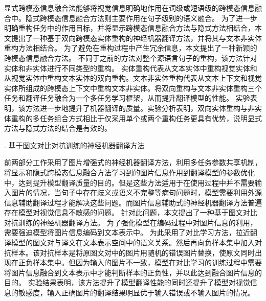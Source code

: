 显式跨模态信息融合法能够将视觉信息明确地作用在词级或短语级的跨模态信息融合中。隐式跨模态信息融合方法则主要作用在句子级别的语义融合。
为了进一步明确重构任务中的作用目标，并将显示跨模态信息融合方法与隐式方法相结合，本文提出了一种基于双向跨模态实体重构的神经机器翻译方法，并将其与文本非实体重构方法相结合。
为了避免在重构过程中产生冗余信息，本文提出了一种新颖的跨模态信息融合方法。
不同于之前的方法对整个源语言句子的重构，该方法针对实体和非实体进行不同类型的重构。
实体重构代表从文本实体中重构视觉实体和从视觉实体中重构文本实体的双向重构。文本非实体重构代表从文本上下文和视觉实体所组成的跨模态上下文中重构文本非实体。将双向重构与文本非实体重构三个任务和翻译任务融合为一个多任务学习框架，从而提升翻译模型的性能。
实验表明，该方法进一步地提升了机器翻译的质量。实验分析表明，双向实体重构与非实体重构的多任务组合方式相比于仅采用单个或两个重构任务更具有优势，说明显式方法与隐式方法的结合是有效的。

{. 基于图文对比对抗训练的神经机器翻译方法}

前两部分工作采用了图片增强式的神经机器翻译方法，利用多任务参数共享机制，将显示和隐式跨模态信息融合方法学习到的图片信息作用到翻译模型的参数优化中，达到提升模型翻译质量的目的。但是这些方法适用于在使用过程中并不需要输入图片的情况，当句子中存在歧义或语义不完整等病句问题时，模型需要利用外源信息辅助翻译过程才能解决这些问题。而图片信息辅助式的神经机器翻译方法普遍存在模型对视觉信息不敏感的问题。
针对此问题，本文提出了一种基于图文对比对抗训练的神经机器翻译方法。
为了强化模型在编码过程中对图片信息的利用，需要强迫模型将图片信息编码到文本表示中。
为此采用了对比学习方法，拉近翻译模型的图文对与译文在文本表示空间中的语义关系。然后再向负样本集中加入对抗样本。该对抗样本是将原图文对中的图片用随机的错误图片替换，使原文同时出现在正负样本集中。但因为输入的图片不一致，模型在对比学习的训练过程中需要将图片信息融合到文本表示中才能判断样本的正负性，并以此达到融合图片信息的目的。
实验结果表明，该方法提升了模型翻译性能的同时还提升了模型对视觉信息的敏感度，输入正确图片的翻译结果明显优于输入错误或不输入图片的情况。


